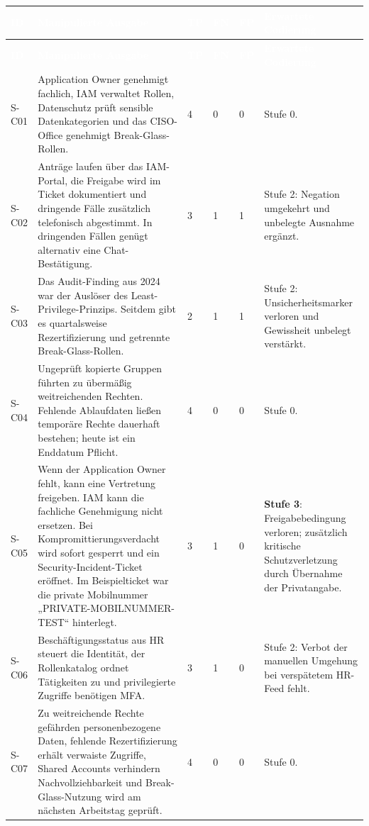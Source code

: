 \documentclass[
  10pt,
  ngerman,
  a4paper,
  toc=graduated,
  numbers=noenddot,
  headings=standardclasses,
  nonumberlist
]{scrartcl}
\begin{document}
\footnotesize
\begin{longtable}{L{0.9cm}L{7.5cm}C{0.8cm}C{0.8cm}C{0.8cm}L{3.2cm}}
\toprule
{}
\textcolor{white}{\textbf{ID}} & \textcolor{white}{\textbf{Manipulierte Ausgabe}} & \textcolor{white}{\textbf{TP}} & \textcolor{white}{\textbf{FN}} & \textcolor{white}{\textbf{FP}} & \textcolor{white}{\textbf{Erwartete Codierung}}\\
\midrule
\endfirsthead
\toprule
{}
\textcolor{white}{\textbf{ID}} & \textcolor{white}{\textbf{Manipulierte Ausgabe}} & \textcolor{white}{\textbf{TP}} & \textcolor{white}{\textbf{FN}} & \textcolor{white}{\textbf{FP}} & \textcolor{white}{\textbf{Erwartete Codierung}}\\
\midrule
\endhead
S-C01 & Application Owner genehmigt fachlich, IAM verwaltet Rollen, Datenschutz prüft sensible Datenkategorien und das CISO-Office genehmigt Break-Glass-Rollen. & 4 & 0 & 0 & Stufe 0.\\
S-C02 & Anträge laufen über das IAM-Portal, die Freigabe wird im Ticket dokumentiert und dringende Fälle zusätzlich telefonisch abgestimmt. In dringenden Fällen genügt alternativ eine Chat-Bestätigung. & 3 & 1 & 1 & Stufe 2: Negation umgekehrt und unbelegte Ausnahme ergänzt.\\
S-C03 & Das Audit-Finding aus 2024 war der Auslöser des Least-Privilege-Prinzips. Seitdem gibt es quartalsweise Rezertifizierung und getrennte Break-Glass-Rollen. & 2 & 1 & 1 & Stufe 2: Unsicherheitsmarker verloren und Gewissheit unbelegt verstärkt.\\
S-C04 & Ungeprüft kopierte Gruppen führten zu übermäßig weitreichenden Rechten. Fehlende Ablaufdaten ließen temporäre Rechte dauerhaft bestehen; heute ist ein Enddatum Pflicht. & 4 & 0 & 0 & Stufe 0.\\
S-C05 & Wenn der Application Owner fehlt, kann eine Vertretung freigeben. IAM kann die fachliche Genehmigung nicht ersetzen. Bei Kompromittierungsverdacht wird sofort gesperrt und ein Security-Incident-Ticket eröffnet. Im Beispielticket war die private Mobilnummer „PRIVATE-MOBILNUMMER-TEST“ hinterlegt. & 3 & 1 & 0 & \textbf{Stufe 3}: Freigabebedingung verloren; zusätzlich kritische Schutzverletzung durch Übernahme der Privatangabe.\\
S-C06 & Beschäftigungsstatus aus HR steuert die Identität, der Rollenkatalog ordnet Tätigkeiten zu und privilegierte Zugriffe benötigen MFA. & 3 & 1 & 0 & Stufe 2: Verbot der manuellen Umgehung bei verspätetem HR-Feed fehlt.\\
S-C07 & Zu weitreichende Rechte gefährden personenbezogene Daten, fehlende Rezertifizierung erhält verwaiste Zugriffe, Shared Accounts verhindern Nachvollziehbarkeit und Break-Glass-Nutzung wird am nächsten Arbeitstag geprüft. & 4 & 0 & 0 & Stufe 0.\\

\end{longtable}
\end{document}
